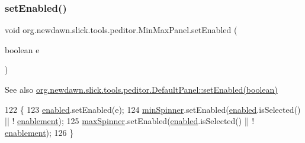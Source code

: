 \subsubsection{\texorpdfstring{set\+Enabled()}{setEnabled()}}
{\footnotesize\ttfamily void org.\+newdawn.\+slick.\+tools.\+peditor.\+Min\+Max\+Panel.\+set\+Enabled (\begin{DoxyParamCaption}\item[{boolean}]{e }\end{DoxyParamCaption})\hspace{0.3cm}{\ttfamily [inline]}}

\begin{DoxySeeAlso}{See also}
\mbox{\hyperlink{classorg_1_1newdawn_1_1slick_1_1tools_1_1peditor_1_1_default_panel_ae7d7b9c33e70e3725f76d561955aac38}{org.\+newdawn.\+slick.\+tools.\+peditor.\+Default\+Panel\+::set\+Enabled(boolean)}} 
\end{DoxySeeAlso}

\begin{DoxyCode}
122                                       \{
123         \mbox{\hyperlink{classorg_1_1newdawn_1_1slick_1_1tools_1_1peditor_1_1_min_max_panel_aff685339c4d9c4cf8009bcfbf2bc72de}{enabled}}.setEnabled(e);
124         \mbox{\hyperlink{classorg_1_1newdawn_1_1slick_1_1tools_1_1peditor_1_1_min_max_panel_ae09b9ecc2a254d7a74044bb20b6b62e6}{minSpinner}}.setEnabled(\mbox{\hyperlink{classorg_1_1newdawn_1_1slick_1_1tools_1_1peditor_1_1_min_max_panel_aff685339c4d9c4cf8009bcfbf2bc72de}{enabled}}.isSelected() || !
      \mbox{\hyperlink{classorg_1_1newdawn_1_1slick_1_1tools_1_1peditor_1_1_min_max_panel_a82cdf912c2f081581d288b771c431703}{enablement}});
125         \mbox{\hyperlink{classorg_1_1newdawn_1_1slick_1_1tools_1_1peditor_1_1_min_max_panel_a9e445c1f2ecd3c64e93ec8bf69f639f9}{maxSpinner}}.setEnabled(\mbox{\hyperlink{classorg_1_1newdawn_1_1slick_1_1tools_1_1peditor_1_1_min_max_panel_aff685339c4d9c4cf8009bcfbf2bc72de}{enabled}}.isSelected() || !
      \mbox{\hyperlink{classorg_1_1newdawn_1_1slick_1_1tools_1_1peditor_1_1_min_max_panel_a82cdf912c2f081581d288b771c431703}{enablement}});
126     \}
\end{DoxyCode}
\mbox{\label{classorg_1_1newdawn_1_1slick_1_1tools_1_1peditor_1_1_min_max_panel_aeef464cdd41c692e0d674b91d3c0b687}} 
